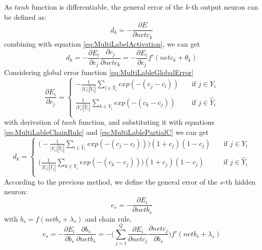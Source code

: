 As $tanh$ function is differentiable, the general error of the $k$-th output neuron can be defined as:
\begin{equation}\label{eq:MultiLableErrorDif}
d_{k} = -\frac{\partial E}{\partial netc_{k}}
\end{equation}
combining with equation \ref{eq:MultiLabelActivation}, we can get
\begin{equation}\label{eq:MultiLableChainRule}
d_{k} = -\frac{\partial E_{i}}{\partial c_{j}} \frac{\partial c_{j}}{\partial netc_{k}} = - \frac{\partial E_{i}}{\partial c_{j}} f'(netc_{k} + \theta_{k})
\end{equation}
Considering global error function \ref{eq:MultiLableGlobalError}
\begin{equation}\label{eq:MultiLablePartialC}
\frac{\partial E_{i}}{\partial c_{j}}= 
\begin{cases}
    -\frac{1}{|Y_{i}||\hat{Y}_{i}|} \sum_{l \in \hat{Y}_{i}} exp(-(c_{j} - c_{l}))       & \quad \text{if } j \in Y_{i}\\
    \frac{1}{|Y_{i}||\hat{Y}_{i}|} \sum_{k \in Y_{i}} exp(-(c_{k} - c_{j}))       & \quad \text{if } j \in \hat{Y}_{i}\\
  \end{cases}
\end{equation}
with derivation of $tanh$ function, and substituting it with equations \ref{eq:MultiLableChainRule} and \ref{eq:MultiLablePartialC} we can get
\begin{equation}\label{eq:MultiLableGenErr}
d_{k}= 
\begin{cases}
    \big(-\frac{1}{|Y_{i}||\hat{Y}_{i}|} \sum_{l \in \hat{Y}_{i}} exp(-(c_{j} - c_{l}))\big)(1+c_{j})(1-c_{j})       & \quad \text{if } j \in Y_{i}\\
    \big(\frac{1}{|Y_{i}||\hat{Y}_{i}|} \sum_{k \in Y_{i}} exp(-(c_{k} - c_{j}))\big)(1+c_{j})(1-c_{j})       & \quad \text{if } j \in \hat{Y}_{i}\\
  \end{cases}
\end{equation}
According to the previous method, we define the general error of the $s$-th hidden neuron:
\begin{equation}\label{eq:MultiLableGenErrS}
e_{s} = - \frac{\partial E_{i}}{\partial netb_{s}}
\end{equation}
with $b_{s} = f(netb_{s} + \lambda_{s})$ and chain rule,
\begin{equation}\label{eq:MultiLablePartialE}
e_{s} = - \frac{\partial E_{i}}{\partial b_{s}} \frac{\partial b_{s}}{\partial netb_{s}} = - \big( \sum_{j=1}^Q \frac{\partial E_{i}}{\partial netc_{j}} \frac{\partial netc_{j}}{\partial b_{s}}\big)f'(netb_{s} + \lambda_{s})
\end{equation}
